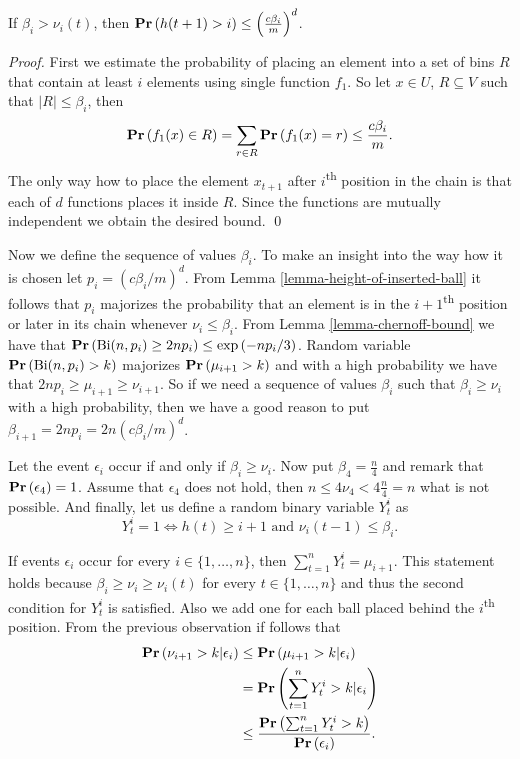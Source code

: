 \begin{lemma}
\label{lemma-height-of-inserted-ball}
If $\beta_i > \nu_i(t)$, then $\mathbf{Pr}\left(h(t + 1) > i\right) \leq \left(\frac{c\beta_i}{m}\right) ^ d$.
\end{lemma}
\begin{proof}
First we estimate the probability of placing an element into a set of bins $R$ that contain at least $i$ elements using single function $f_1$. So let $x \in U$, $R \subseteq V$ such that $|R| \leq \beta_i$, then $$\mathbf{Pr}\left(f_1(x) \in R\right) = \displaystyle\sum_{r \in R} \mathbf{Pr}\left(f_1(x) = r\right) \leq \frac{c\beta_i}{m}.$$
The only way how to place the element $x_{t + 1}$ after $i$\textsuperscript{th} position in the chain is that each of $d$ functions places it inside $R$. Since the functions are mutually independent we obtain the desired bound.
\qed
\end{proof}

Now we define the sequence of values $\beta_i$. To make an insight into the way how it is chosen let $p_i = \left({c\beta_i}/{m}\right) ^ d$. From Lemma \ref{lemma-height-of-inserted-ball} it follows that $p_i$ majorizes the probability that an element is in the $i + 1$\textsuperscript{th} position or later in its chain whenever $\nu_i \leq \beta_i$. From Lemma \ref{lemma-chernoff-bound} we have that $\mathbf{Pr}\left(\mathrm{Bi}(n, p_i) \geq 2np_i\right) \leq \exp\left({-np_i}/{3}\right)$. Random variable $\mathbf{Pr}\left(\mathrm{Bi}(n, p_i) > k\right)$ majorizes $\mathbf{Pr}\left(\mu_{i + 1} > k\right)$ and with a high probability we have that $2np_i \geq \mu_{i + 1} \geq \nu_{i + 1}$. So if we need a sequence of values $\beta_i$ such that $\beta_i \geq \nu_{i}$ with a high probability, then we have a good reason to put $\beta_{i + 1} = 2np_i = 2n\left({c\beta_i}/{m}\right) ^ d$.

Let the event $\epsilon_i$ occur if and only if $\beta_i \geq \nu_i$. Now put $\beta_4 = \frac{n}{4}$ and remark that $\mathbf{Pr}\left(\epsilon_4\right) = 1$. Assume that $\epsilon_4$ does not hold, then $n \leq 4 \nu_4 < 4 \frac{n}{4} = n$ what is not possible. And finally, let us define a random binary variable $Y_t^i$ as $$Y_t^i = 1 \Leftrightarrow h(t) \geq i + 1 \mbox{ and } \nu_i(t - 1) \leq \beta_i \textit{.}$$

If events $\epsilon_i$ occur for every $i \in \{1, \dots, n\}$, then $\sum_{t = 1}^{n} Y_t^i = \mu_{i + 1}$. This statement holds because $\beta_i \geq \nu_i \geq \nu_i(t)$ for every $t \in \{1, \dots, n\}$ and thus the second condition for $Y_t^i$ is satisfied. Also we add one for each ball placed behind the $i$\textsuperscript{th} position. 
From the previous observation if follows that
\[
\begin{split}
\mathbf{Pr}\left(\nu_{i + 1} > k | \epsilon_i\right) 
	& \leq \mathbf{Pr}\left(\mu_{i + 1} > k | \epsilon_i\right) \\
	& = \mathbf{Pr}\left(\displaystyle\sum_{t = 1}^{n} Y_t^{i} > k | \epsilon_i\right) \\
	& \leq \frac{\mathbf{Pr}\left(\sum_{t = 1}^{n} Y_t^{i} > k\right)}{\mathbf{Pr}\left(\epsilon_i\right)}. \\
\end{split}
\]

